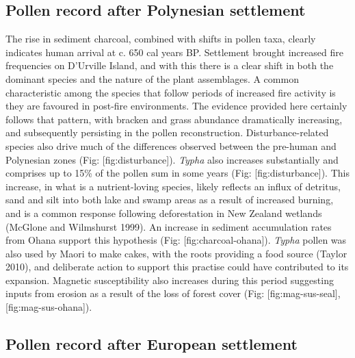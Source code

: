 \subsection{Pollen record after Polynesian
settlement}\label{pollen-record-after-polynesian-settlement}

The rise in sediment charcoal, combined with shifts in pollen taxa,
clearly indicates human arrival at c. 650 cal years BP. Settlement
brought increased fire frequencies on D'Urville Island, and with this
there is a clear shift in both the dominant species and the nature of
the plant assemblages. A common characteristic among the species that
follow periods of increased fire activity is they are favoured in
post-fire environments. The evidence provided here certainly follows
that pattern, with bracken and grass abundance dramatically increasing,
and subsequently persisting in the pollen reconstruction.
Disturbance-related species also drive much of the differences observed
between the pre-human and Polynesian zones (Fig: {[}fig:disturbance{]}).
\emph{Typha} also increases substantially and comprises up to 15\% of
the pollen sum in some years (Fig: {[}fig:disturbance{]}). This
increase, in what is a nutrient-loving species, likely reflects an
influx of detritus, sand and silt into both lake and swamp areas as a
result of increased burning, and is a common response following
deforestation in New Zealand wetlands (McGlone and Wilmshurst 1999). An
increase in sediment accumulation rates from Ohana support this
hypothesis (Fig: {[}fig:charcoal-ohana{]}). \emph{Typha} pollen was also
used by Maori to make cakes, with the roots providing a food source
(Taylor 2010), and deliberate action to support this practise could have
contributed to its expansion. Magnetic susceptibility also increases
during this period suggesting inputs from erosion as a result of the
loss of forest cover (Fig: {[}fig:mag-sus-seal{]},
{[}fig:mag-sus-ohana{]}).

\subsection{Pollen record after European
settlement}\label{pollen-record-after-european-settlement}

